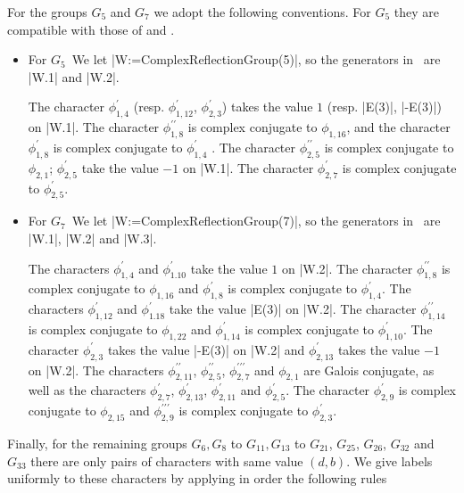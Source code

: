 For the groups $G_5$ and $G_7$ we adopt the following conventions.
For $G_5$ they are compatible with those of \cite{MR03} and \cite{BMM14}.
\begin{itemize}
\item  For $G_5$\:\
We  let |W:=ComplexReflectionGroup(5)|,  so the  generators in \CHEVIE\ are
|W.1| and |W.2|.

The     character    $\phi_{1,4}^\prime$    (resp.    $\phi_{1,12}^\prime$,
$\phi_{2,3}^\prime$)  takes the value $1$ (resp. |E(3)|, |-E(3)|) on |W.1|.
The   character   $\phi_{1,8}^{\prime\prime}$   is   complex  conjugate  to
$\phi_{1,16}$,  and the character  $\phi_{1,8}^\prime$ is complex conjugate
to  $\phi_{1,4}^\prime$  .  The  character  $\phi_{2,5}^{\prime\prime}$  is
complex  conjugate to $\phi_{2,1}$; $\phi_{2,5}^\prime$ take the value $-1$
on  |W.1|.  The  character  $\phi_{2,7}^\prime$  is  complex  conjugate  to
$\phi_{2,5}^\prime$.

\item  For $G_7$\:\
We  let |W:=ComplexReflectionGroup(7)|,  so the  generators in \CHEVIE\ are
|W.1|, |W.2| and |W.3|.

The  characters $\phi_{1,4}^\prime$ and $\phi_{1.10}^\prime$ take the value
$1$   on  |W.2|.  The   character  $\phi_{1,8}^{\prime\prime}$  is  complex
conjugate  to $\phi_{1,16}$ and $\phi_{1,8}^\prime$ is complex conjugate to
$\phi_{1,4}^\prime$.     The     characters     $\phi_{1,12}^\prime$    and
$\phi_{1.18}^\prime$   take  the  value  |E(3)|  on  |W.2|.  The  character
$\phi_{1,14}^{\prime\prime}$  is  complex  conjugate  to  $\phi_{1,22}$ and
$\phi_{1,14}^\prime$  is  complex  conjugate  to  $\phi_{1,10}^\prime$. The
character   $\phi_{2,3}^\prime$  takes  the  value  |-E(3)|  on  |W.2|  and
$\phi_{2,13}^\prime$   takes  the  value  $-1$  on  |W.2|.  The  characters
$\phi_{2,11}^{\prime\prime}$, $\phi_{2,5}^{\prime\prime}$,
$\phi_{2,7}^{\prime\prime\prime}$ and $\phi_{2,1}$ are Galois conjugate, as
well   as   the   characters   $\phi_{2,7}^\prime$,   $\phi_{2,13}^\prime$,
$\phi_{2,11}^\prime$ and $\phi_{2,5}^\prime$. The character
$\phi_{2,9}^\prime$    is   complex   conjugate    to   $\phi_{2,15}$   and
$\phi_{2,9}^{\prime\prime\prime}$ is complex conjugate to
$\phi_{2,3}^\prime$.
\end{itemize}

Finally,  for  the  remaining  groups  $G_6,  G_8$  to  $G_{11}, G_{13}$ to
$G_{21}$, $G_{25}$, $G_{26}$, $G_{32}$ and $G_{33}$ there are only pairs of
characters  with  same  value  $(d,b)$.  We  give labels uniformly to these
characters by applying in order the following rules \:\

